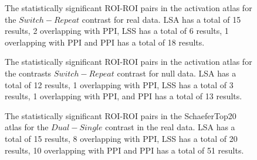 \documentclass[phd,appendix,figures]{uithesis}
\begin{document}
\begin{figure}[H]
  \ContinuedFloat
  \centering


  \caption[All contrasts for all atlases for all data for LSA/LSS versus PPI continued...]{
      The statistically significant ROI-ROI pairs in the activation atlas
      for the $Switch - Repeat$ contrast for real data.
      LSA has a total of 15 results, 2 overlapping with PPI,
      LSS has a total of 6 results, 1 overlapping with PPI and
      PPI has a total of 18 results.
  }
  \label{fig:data-real_type-brain_atlas-activation_contrast-switchxrepeat}
\end{figure}

\begin{figure}[H]
  \ContinuedFloat
  \centering


  \caption[All contrasts for all atlases for all data for LSA/LSS versus PPI continued...]{
      The statistically significant ROI-ROI pairs in the activation atlas
      for the contrasts $Switch - Repeat$ contrast for null data.
      LSA has a total of 12 results, 1 overlapping with PPI,
      LSS has a total of 3 results, 1 overlapping with PPI,
      and PPI has a total of 13 results.
  }
  \label{fig:data-null_type-brain_atlas-activation_contrast-switchxrepeat}
\end{figure}
\begin{figure}[H]
  \centering


  \caption[All contrasts for all atlases for all data for LSA/LSS versus PPI continued...]{
      The statistically significant ROI-ROI pairs in the SchaeferTop20 atlas
      for the $Dual - Single$ contrast in the real data.
      LSA has a total of 15 results, 8 overlapping with PPI,
      LSS has a total of 20 results, 10 overlapping with PPI and
      PPI has a total of 51 results.
  }
  \label{fig:data-real_type-brain_atlas-schaeferbest_contrast-dualxsingle}
\end{figure}
\end{document}
